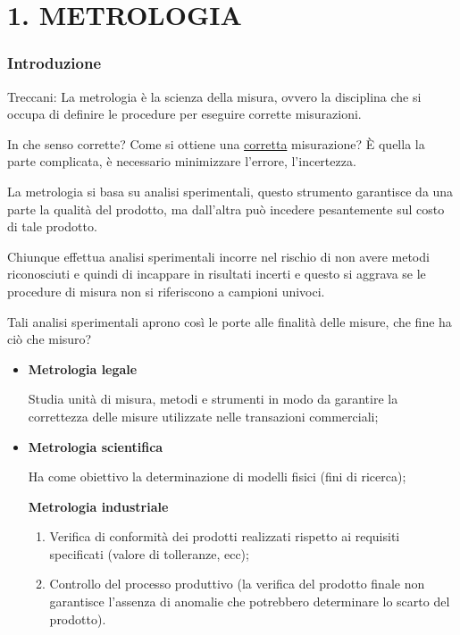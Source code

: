 \documentclass[a4paper, 15pt]{article}
\begin{document}
		\tableofcontents 
		\newpage
	
\part{1. METROLOGIA}	
\section{Introduzione}	
	\begin{adjustwidth}{2in}{}
		Treccani: La metrologia è la scienza della misura, ovvero la disciplina che si occupa di
	definire le procedure per eseguire corrette misurazioni. 
	
	In che senso corrette? Come si ottiene una \underline{corretta} misurazione? È quella la parte complicata, è necessario minimizzare l'errore, l'incertezza.
	
	La metrologia si basa su analisi sperimentali, questo strumento garantisce da una parte la qualità del prodotto, ma dall'altra può incedere pesantemente sul costo di tale prodotto.
	
	Chiunque effettua analisi sperimentali incorre nel rischio di non avere metodi riconosciuti e quindi di incappare in risultati incerti e questo si aggrava se le procedure di misura non si riferiscono a campioni univoci. 
	
	Tali analisi sperimentali aprono così le porte alle finalità delle misure, che fine ha ciò che misuro? \newline
	

		\begin{itemize}
 		\item \textbf{Metrologia legale}
		
		Studia unità di misura, metodi e strumenti in modo da garantire la correttezza delle misure utilizzate nelle transazioni commerciali;
		
		\item \textbf{Metrologia scientifica} 
		
		Ha come obiettivo la determinazione di modelli fisici (fini di ricerca);
		
		 \textbf{Metrologia industriale} 		
		\begin{enumerate}
			\item Verifica di conformità dei prodotti realizzati rispetto ai requisiti specificati (valore di tolleranze, ecc); 
			\item Controllo del processo produttivo (la verifica del prodotto finale non garantisce l’assenza di anomalie che potrebbero determinare lo scarto del prodotto).
		\end{enumerate}
		\end{itemize}
	\end{adjustwidth}		
\end{document}
